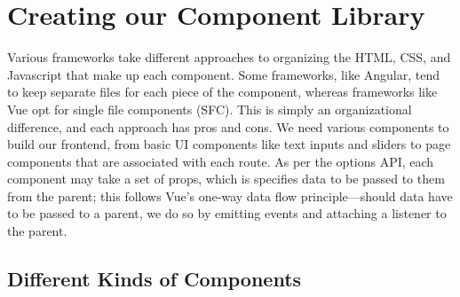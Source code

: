 \documentclass[11pt, twoside, reqno]{book}
\begin{document}
\section{Creating our Component Library}


Various frameworks take different approaches to organizing the HTML, CSS, and Javascript that make up each component. Some frameworks, like Angular, tend to keep separate files for each piece of the component, whereas frameworks like Vue opt for single file components (SFC). This is simply an organizational difference, and each approach has pros and cons. We need various components to build our frontend, from basic UI components like text inputs and sliders to page components that are associated with each route. As per the options API, each component may take a set of \textit{}props\textit{}, which is specifies data to be passed to them from the parent; this follows Vue's one-way data flow principle—should data have to be passed to a parent, we do so by emitting events and attaching a listener to the parent.

\subsection{Different Kinds of Components}
\end{document}
